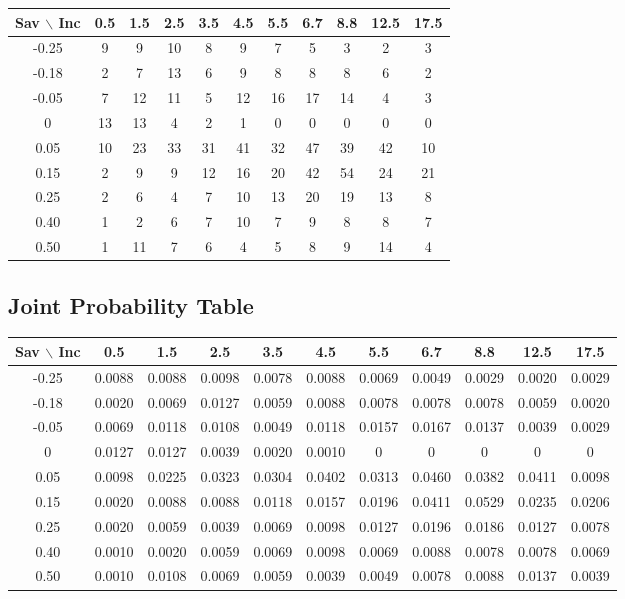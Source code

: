 \documentclass[12pt]{article}
\begin{document}
\begin{center}
\begin{tabular}{c|cccccccccc}
\toprule
Sav $\backslash$ Inc
& 0.5 & 1.5 & 2.5 & 3.5 & 4.5 & 5.5 & 6.7 & 8.8 & 12.5 & 17.5 \\
\midrule
-0.25 & 9 & 9 & 10 & 8 & 9 & 7 & 5 & 3 & 2 & 3 \\
-0.18 & 2 & 7 & 13 & 6 & 9 & 8 & 8 & 8 & 6 & 2 \\
-0.05 & 7 & 12 & 11 & 5 & 12 & 16 & 17 & 14 & 4 & 3 \\
0     & 13 & 13 & 4 & 2 & 1 & 0 & 0 & 0 & 0 & 0 \\
0.05  & 10 & 23 & 33 & 31 & 41 & 32 & 47 & 39 & 42 & 10 \\
0.15  & 2 & 9 & 9 & 12 & 16 & 20 & 42 & 54 & 24 & 21 \\
0.25  & 2 & 6 & 4 & 7 & 10 & 13 & 20 & 19 & 13 & 8 \\
0.40  & 1 & 2 & 6 & 7 & 10 & 7 & 9 & 8 & 8 & 7 \\
0.50  & 1 & 11 & 7 & 6 & 4 & 5 & 8 & 9 & 14 & 4 \\
\bottomrule
\end{tabular}
\end{center}


\subsection*{Joint Probability Table}

\begin{center}
\footnotesize{
\begin{tabular}{c|cccccccccc}
\toprule
Sav $\backslash$ Inc
& 0.5 & 1.5 & 2.5 & 3.5 & 4.5 & 5.5 & 6.7 & 8.8 & 12.5 & 17.5 \\
\midrule
-0.25 & 0.0088 & 0.0088 & 0.0098 & 0.0078 & 0.0088 & 0.0069 & 0.0049 & 0.0029 & 0.0020 & 0.0029 \\
-0.18 & 0.0020 & 0.0069 & 0.0127 & 0.0059 & 0.0088 & 0.0078 & 0.0078 & 0.0078 & 0.0059 & 0.0020 \\
-0.05 & 0.0069 & 0.0118 & 0.0108 & 0.0049 & 0.0118 & 0.0157 & 0.0167 & 0.0137 & 0.0039 & 0.0029 \\
0     & 0.0127 & 0.0127 & 0.0039 & 0.0020 & 0.0010 & 0 & 0 & 0 & 0 & 0 \\
0.05  & 0.0098 & 0.0225 & 0.0323 & 0.0304 & 0.0402 & 0.0313 & 0.0460 & 0.0382 & 0.0411 & 0.0098 \\
0.15  & 0.0020 & 0.0088 & 0.0088 & 0.0118 & 0.0157 & 0.0196 & 0.0411 & 0.0529 & 0.0235 & 0.0206 \\
0.25  & 0.0020 & 0.0059 & 0.0039 & 0.0069 & 0.0098 & 0.0127 & 0.0196 & 0.0186 & 0.0127 & 0.0078 \\
0.40  & 0.0010 & 0.0020 & 0.0059 & 0.0069 & 0.0098 & 0.0069 & 0.0088 & 0.0078 & 0.0078 & 0.0069 \\
0.50  & 0.0010 & 0.0108 & 0.0069 & 0.0059 & 0.0039 & 0.0049 & 0.0078 & 0.0088 & 0.0137 & 0.0039 \\
\bottomrule
\end{tabular}
}
\end{center}
\end{document}
